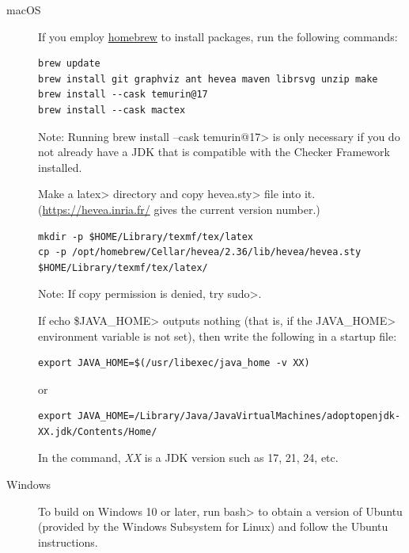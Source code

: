 \begin{description}
\item[macOS]
  If you employ \href{https://brew.sh}{homebrew} to install packages, run
  the following commands:

\begin{Verbatim}
brew update
brew install git graphviz ant hevea maven librsvg unzip make
brew install --cask temurin@17
brew install --cask mactex
\end{Verbatim}

Note: Running \<brew install --cask temurin@17> is only necessary if you do not
already have a JDK that is compatible with the Checker Framework installed.

Make a \<latex> directory and copy \<hevea.sty> file into it.
(\url{https://hevea.inria.fr/} gives the current version number.)

\begin{Verbatim}
mkdir -p $HOME/Library/texmf/tex/latex
cp -p /opt/homebrew/Cellar/hevea/2.36/lib/hevea/hevea.sty $HOME/Library/texmf/tex/latex/
\end{Verbatim}

Note: If copy permission is denied, try \<sudo>.

If \<echo \$JAVA\_HOME> outputs nothing (that is, if the \<JAVA\_HOME>
environment variable is not set), then write the following
in a startup file:

\begin{Verbatim}
export JAVA_HOME=$(/usr/libexec/java_home -v XX)
\end{Verbatim}
or
\begin{Verbatim}
export JAVA_HOME=/Library/Java/JavaVirtualMachines/adoptopenjdk-XX.jdk/Contents/Home/
\end{Verbatim}

In the command, \emph{XX} is a JDK version such as 17, 21, 24, etc.

\item[Windows]
  To build on Windows 10 or later,
  run \<bash> to obtain a version of
  Ubuntu (provided by the Windows Subsystem for Linux) and follow the Ubuntu
  instructions.


\end{description}


